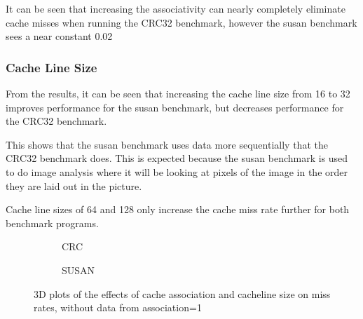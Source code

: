 It can be seen that increasing the associativity can nearly completely eliminate 
cache misses when running the CRC32 benchmark, however the susan benchmark sees a near 
constant 0.02%

\subsubsection{Cache Line Size}

From the results, it can be seen that increasing the cache line size from 16 to 32 
improves performance for the susan benchmark, but decreases performance for the CRC32 
benchmark. 

This shows that the susan benchmark uses data more sequentially that the CRC32 benchmark 
does.
This is expected because the susan benchmark is used to do image analysis where it will be 
looking at pixels of the image in the order they are laid out in the picture.

Cache line sizes of 64 and 128 only increase the cache miss rate further for 
both benchmark programs.


\begin{figure}[H]%
\begin{subfigure}{.45\textwidth}
    \centering
    
    \caption{CRC}
    \label{fig:partb-2d-crc}
\end{subfigure}%
\hfill%
\begin{subfigure}{.45\textwidth}
    \centering
    
    \caption{SUSAN}
    \label{fig:partb-2d-susan}
\end{subfigure}%
\caption{3D plots of the effects of cache association and cacheline size on miss rates, without data from association=1}
\end{figure}
